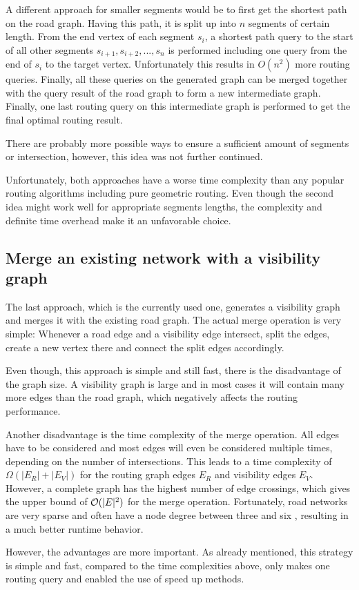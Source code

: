 		A different approach for smaller segments would be to first get the shortest path on the road graph.
		Having this path, it is split up into $n$ segments of certain length.
		From the end vertex of each segment $s_i$, a shortest path query to the start of all other segments $s_{i+1}, s_{i+2}, ..., s_n$ is performed including one query from the end of $s_i$ to the target vertex.
		Unfortunately this results in $O(n^2)$ more routing queries.
		Finally, all these queries on the generated graph can be merged together with the query result of the road graph to form a new intermediate graph.
		Finally, one last routing query on this intermediate graph is performed to get the final optimal routing result.
		
		There are probably more possible ways to ensure a sufficient amount of segments or intersection, however, this idea was not further continued.
		
		Unfortunately, both approaches have a worse time complexity than any popular routing algorithms including pure geometric routing.
		Even though the second idea might work well for appropriate segments lengths, the complexity and definite time overhead make it an unfavorable choice.
	
	\subsection{Merge an existing network with a visibility graph}
	
		The last approach, which is the currently used one, generates a visibility graph and merges it with the existing road graph.
		The actual merge operation is very simple:
		Whenever a road edge and a visibility edge intersect, split the edges, create a new vertex there and connect the split edges accordingly.
		
		Even though, this approach is simple and still fast, there is the disadvantage of the graph size.
		A visibility graph is large and in most cases it will contain many more edges than the road graph, which negatively affects the routing performance.
		
		Another disadvantage is the time complexity of the merge operation.
		All edges have to be considered and most edges will even be considered multiple times, depending on the number of intersections.
		This leads to a time complexity of $\Omega(|E_R| + |E_V|)$ for the routing graph edges $E_R$ and visibility edges $E_V$.
		However, a complete graph has the highest number of edge crossings, which gives the upper bound of $\mathcal{O}(|E|^2)$ for the merge operation.
		Fortunately, road networks are very sparse and often have a node degree between three and six \cite{zhao-analysis-osm-bejing}\cite{boeing-osmnx}, resulting in a much better runtime behavior.
		
		However, the advantages are more important.
		As already mentioned, this strategy is simple and fast, compared to the time complexities above, only makes one routing query and enabled the use of speed up methods.
